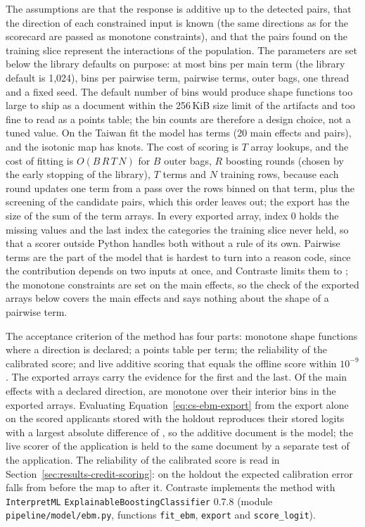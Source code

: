 The assumptions are that the response is additive up to the detected pairs, that the direction of each constrained input is known
(the same directions as for the scorecard are passed as monotone constraints), and that the pairs found on the training slice
represent the interactions of the population. The parameters are set below the library defaults on purpose: at most
\csEbMaxBins{} bins per main term (the library default is 1,024), \csEbMaxIntBins{} bins per pairwise term, \csEbInteractions{}
pairwise terms, \csEbOuterBags{} outer bags, one thread and a fixed seed. The default number of bins would produce shape
functions too large to ship as a document within the 256\,KiB size limit of the artifacts and too fine to read as a points table; the
bin counts are therefore a design choice, not a tuned value. On the Taiwan fit the model has \csFitTwEbTerms{} terms (20 main
effects and \csEbmPairs{} pairs), and the isotonic map has \csFitTwEbKnots{} knots. The cost of scoring is $T$ array lookups, and
the cost of fitting is $O(B\,R\,T\,N)$ for $B$ outer bags, $R$ boosting rounds (chosen by the early stopping of the library), $T$
terms and $N$ training rows, because each round updates one term from a pass over the rows binned on that term, plus the screening of
the candidate pairs, which this order leaves out; the export has the size of the sum of the term arrays. In every exported array, index 0 holds the missing values and the last index the categories the training slice never
held, so that a scorer outside Python handles both without a rule of its own. Pairwise terms are the part of the model that is
hardest to turn into a reason code, since the contribution depends on two inputs at once, and Contraste limits them to
\csEbInteractions{}; the monotone constraints are set on the main effects, so the check of the exported arrays below covers the main
effects and says nothing about the shape of a pairwise term.

The acceptance criterion of the method has four parts: monotone shape functions where a direction is declared; a points table per
term; the reliability of the calibrated score; and live additive scoring that equals the offline score within $10^{-9}$. The
exported arrays carry the evidence for the first and the last. Of the \csEbmConstrained{} main effects with a declared direction,
\csEbmMonotone{} are monotone over their interior bins in the exported arrays. Evaluating Equation~\eqref{eq:cs-ebm-export} from the
export alone on the \csPointsN{} scored applicants stored with the holdout reproduces their stored logits with a largest absolute
difference of \csEbmGap{}, so the additive document is the model; the live scorer of the application is held to the same document
by a separate test of the application. The reliability of the calibrated score is read in
Section~\ref{sec:results-credit-scoring}: on the holdout the expected calibration error falls from \csHoEceEbRaw{} before the map
to \csHoEceEbCal{} after it. Contraste implements the method with \texttt{InterpretML} \texttt{ExplainableBoostingClassifier}
0.7.8 (module \texttt{pipeline/model/ebm.py}, functions \texttt{fit\_ebm}, \texttt{export} and \texttt{score\_logit}).

